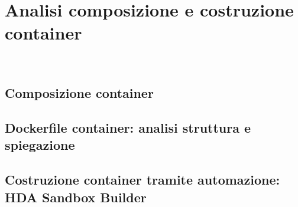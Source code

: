 
\chapter{Analisi composizione e costruzione container}
\label{cap:analisi-container}

\\

\section{Composizione container}



\section{Dockerfile container: analisi struttura e spiegazione}


\section{Costruzione container tramite automazione: HDA Sandbox Builder}
